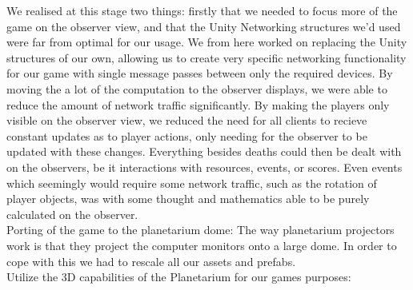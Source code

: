 We realised at this stage two things: firstly that we needed to focus more of the game on the observer view, and that the Unity Networking structures we'd used were far from optimal for our usage. We from here worked on replacing the Unity structures of our own, allowing us to create very specific networking functionality for our game with single message passes between only the required devices. By moving the a lot of the computation to the observer displays, we were able to reduce the amount of network traffic significantly. By making the players only visible on the observer view, we reduced the need for all clients to recieve constant updates as to player actions, only needing for the observer to be updated with these changes. Everything besides deaths could then be dealt with on the observers, be it interactions with resources, events, or scores. Even events which seemingly would require some network traffic, such as the rotation of player objects, was with some thought and mathematics able to be purely calculated on the observer. \\

Porting of the game to the planetarium dome: The way planetarium projectors work is that they project the computer monitors onto a large dome. In order to cope with this we had to rescale all our assets and prefabs.\\

Utilize the 3D capabilities of the Planetarium for our games purposes:



